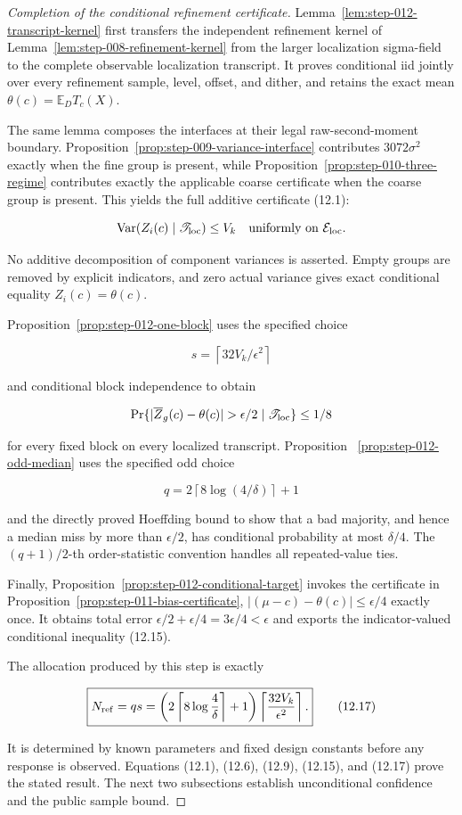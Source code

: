 \begin{proof}[Completion of the conditional refinement certificate]
Lemma~\ref{lem:step-012-transcript-kernel} first transfers the independent
refinement kernel of Lemma~\ref{lem:step-008-refinement-kernel} from the
larger localization sigma-field to the complete observable localization
transcript. It proves
conditional iid jointly over every refinement sample, level, offset, and
dither, and retains the exact mean
\(\theta(c)=\mathbb E_DT_c(X)\).

The same lemma composes the interfaces at their legal
raw-second-moment boundary. Proposition~\ref{prop:step-009-variance-interface} contributes
\(3072\sigma^2\) exactly when the fine group is present, while Proposition~\ref{prop:step-010-three-regime} contributes exactly the
applicable coarse certificate when the coarse group is present. This yields
the full additive certificate (12.1):

\[
\operatorname{Var}(Z_i(c)\mid\mathscr T_{\rm loc})\leq V_k
\quad\text{uniformly on }\mathcal E_{\rm loc}.
\]

No additive decomposition of component variances is asserted. Empty groups
are removed by explicit indicators, and zero actual variance gives exact
conditional equality \(Z_i(c)=\theta(c)\).

Proposition~\ref{prop:step-012-one-block} uses the specified choice

\[
s=\left\lceil32V_k/\epsilon^2\right\rceil
\]

and conditional block independence to obtain

\[
\Pr\{|\overline Z_g(c)-\theta(c)|>\epsilon/2
\mid\mathscr T_{\rm loc}\}\leq1/8
\]

for every fixed block on every localized transcript. Proposition~
\ref{prop:step-012-odd-median} uses the specified odd choice

\[
q=2\left\lceil8\log(4/\delta)\right\rceil+1
\]

and the directly proved Hoeffding bound to show that a bad majority, and
hence a median miss by more than \(\epsilon/2\), has conditional probability
at most \(\delta/4\). The \((q+1)/2\)-th order-statistic convention handles
all repeated-value ties.

Finally, Proposition~\ref{prop:step-012-conditional-target} invokes the
certificate in Proposition~\ref{prop:step-011-bias-certificate},
\(|(\mu-c)-\theta(c)|\leq\epsilon/4\) exactly once. It obtains total error
\(\epsilon/2+\epsilon/4=3\epsilon/4<\epsilon\) and exports the
indicator-valued conditional inequality (12.15).

The allocation produced by this step is exactly

\[
\boxed{
N_{\rm ref}
=qs
=
\left(2\left\lceil8\log\frac4\delta\right\rceil+1\right)
\left\lceil\frac{32V_k}{\epsilon^2}\right\rceil.
}
\tag{12.17}
\]

It is determined by known parameters and fixed design constants
before any response is observed. Equations (12.1), (12.6), (12.9),
(12.15), and (12.17) prove the stated result. The next two subsections
establish unconditional confidence and the public sample bound.
\end{proof}

